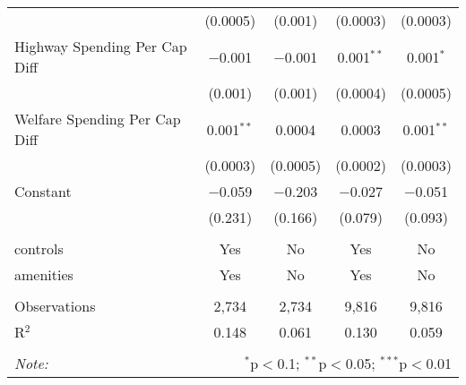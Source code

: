 \begin{table}[!htbp]
\begin{tabular}{@{\extracolsep{5pt}}lcccc}
  & (0.0005) & (0.001) & (0.0003) & (0.0003) \\ 
  Highway Spending Per Cap Diff & $-$0.001 & $-$0.001 & 0.001$^{**}$ & 0.001$^{*}$ \\ 
  & (0.001) & (0.001) & (0.0004) & (0.0005) \\ 
  Welfare Spending Per Cap Diff & 0.001$^{**}$ & 0.0004 & 0.0003 & 0.001$^{**}$ \\ 
  & (0.0003) & (0.0005) & (0.0002) & (0.0003) \\ 
  Constant & $-$0.059 & $-$0.203 & $-$0.027 & $-$0.051 \\ 
  & (0.231) & (0.166) & (0.079) & (0.093) \\ 
 \hline \\[-1.8ex] 
controls & Yes & No & Yes & No \\ 
amenities & Yes & No & Yes & No \\ 
\hline \\[-1.8ex] 
Observations & 2,734 & 2,734 & 9,816 & 9,816 \\ 
R$^{2}$ & 0.148 & 0.061 & 0.130 & 0.059 \\ 
\hline 
\hline \\[-1.8ex] 
\textit{Note:}  & \multicolumn{4}{r}{$^{*}$p$<$0.1; $^{**}$p$<$0.05; $^{***}$p$<$0.01} \\ 
\end{tabular} 
\end{table} 
